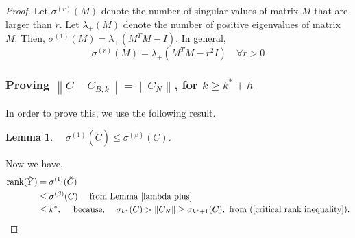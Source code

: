 \documentclass[11pt]{article}
\newcommand{\rank}{\operatorname{rank}}
\newtheorem{lemma}[theorem]{Lemma}
\newcommand{\norm}[1]{\left\|#1\right\|}
\begin{document}
\begin{proof}
\noindent Let $ \sigma^{(r)}(M)$ denote the  number of singular values of matrix $M$ that are larger than $r$. Let $\lambda_{+}(M)$ denote the number of positive eigenvalues of matrix $M$.
Then, $\sigma^{(1)}(M) = \lambda_{+}(M^TM - I)$. In general,
\[ \sigma^{(r)}(M) =  \lambda_{+}( M^TM - r^2 I) \quad \forall r > 0 \]
%
\subsubsection{Proving $\norm{C - C_{B, k}} = \norm{C_N}$, for $k \geq k^* + h$}
%
In order to prove this, we use the following result. %
\\
\begin{lemma}\label{lambda plus}
 $\quad \sigma^{(1)}(\tilde{C}) \leq \sigma^{(\beta)}({C})$.
\end{lemma}
%
%
\noindent Now we have,
\begin{align*}
\rank(\tilde{Y}) & = \sigma^{(1)}(\tilde{C}) \\
& \leq \sigma^{(\beta)}({C})  \quad \text{ from Lemma \ref{lambda plus}}\\
& \leq k^*, \quad \text{ because, }\quad  \sigma_{k^*}(C) > \norm{C_N} \geq \sigma_{k^*+1}(C), \text{ from }(\ref{critical rank inequality}).
\end{align*}
%
%

\end{proof}
\end{document}
